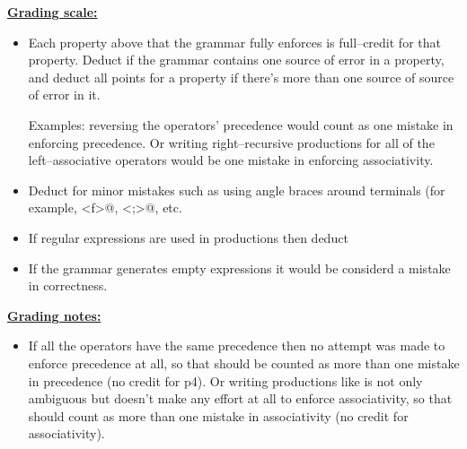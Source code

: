 \documentclass[11pt,fleqn]{article}
\newcommand{\terminal}[1]{\texttt{#1}}
\begin{document}
\begin{enumerate}
\begin{info}{\textbf{\underline{Grading scale:}}}
            \begin{itemize}

              \addtolength{\itemsep}{2mm}

              \item Each property above that the grammar fully enforces is
                    full--credit for that property.  Deduct  if the
                    grammar contains one source of error in a property, and
                    deduct all points for a property if there's more than
                    one source of source of error in it.

                    Examples: reversing the operators' precedence would
                    count as one mistake in enforcing precedence.  Or
                    writing right--recursive productions for all of the
                    left--associative operators would be one mistake in
                    enforcing associativity.

              \item Deduct  for minor mistakes such as using
                    angle braces around terminals (for example,
                    \verb@<f>@, \verb@<;>@, etc.

              \item If regular expressions are used in productions
                    then deduct 

              \item If the grammar generates empty expressions it
                    would be considerd a mistake in correctness.

            \end{itemize}

          \end{info}

          \vspace{-1.5mm}

          \begin{info}{\textbf{\underline{Grading notes:}}}

            \begin{itemize}

              \addtolength{\itemsep}{2mm}

              \item If all the operators have the same precedence
                    then no attempt was made to enforce precedence
                    at all, so that should be counted as more than
                    one mistake in precedence (no credit for p4).
                    Or writing productions like \production{S}{S \
                    \terminal{;} \ S \midspc T} is not only
                    ambiguous but doesn't make any effort at all to
                    enforce associativity, so that should count as
                    more than one mistake in associativity (no
                    credit for associativity).


\end{itemize}
\end{info}
\end{enumerate}
\end{document}
